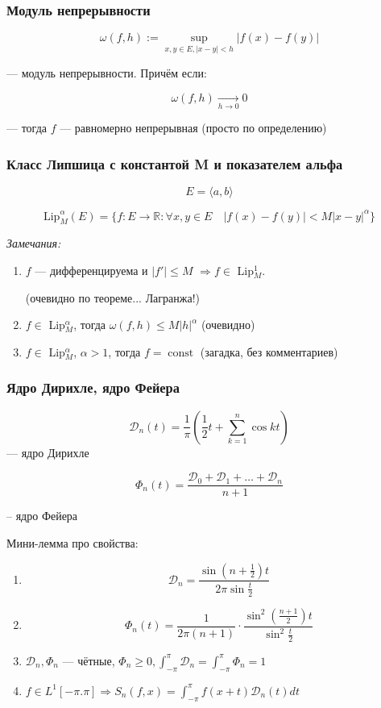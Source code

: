 \documentclass{article}
\def\dbl{\,\,}
\def\goesto#1{\underset{#1}{\longrightarrow}}
\def\DD{\mathcal{D}}
\DeclareMathOperator{\const}{const}
\begin{document}
\subsubsection{Модуль непрерывности}

\[\omega(f, h) := \sup_{x, y \in E,  |x - y| < h} |f(x) - f(y)|\]

--- модуль непрерывности. Причём если:

\[\omega(f, h) \goesto{h \rightarrow 0} 0\]

--- тогда $f$ --- равномерно непрерывная (просто по определению)

\subsubsection{Класс Липшица с константой M и показателем альфа}

\[E = \langle a, b \rangle\]

\[\text{Lip}_M^\alpha(E) = \{f: E \rightarrow \mathbb{R}: \forall x, y \in E \quad |f(x) - f(y)| < M|x - y|^\alpha\}\] 


\textit{Замечания:}

\begin{enumerate}
    \item $f$ --- дифференцируема и $|f'| \le M \dbl \Rightarrow f \in$ Lip$_M^1$.
    
    (очевидно по теореме... Лагранжа!)

    \item $f \in $ Lip$_M^\alpha$, тогда $\omega(f, h) \le M |h|^\alpha$ (очевидно)
    \item $f \in $ Lip$_M^\alpha$, $\alpha > 1$, тогда $f = \const$ (загадка, без комментариев)
\end{enumerate}

\subsubsection{Ядро Дирихле, ядро Фейера}

\[\DD_n(t) = \frac{1}{\pi}\left(\frac{1}{2}t + \sum_{k = 1}^{n} \cos kt\right)\]
--- ядро Дирихле

\[\Phi_n(t) = \frac{\DD_0 + \DD_1 + \ldots + \DD_n}{n + 1}\]

-- ядро Фейера

Мини-лемма про свойства:

\begin{enumerate}
    \item  \[\DD_n = \frac{\sin \left(n + \frac{1}{2}\right)t}{2\pi \sin \frac{t}{2}}\]
    \item  \[\Phi_n(t) = \frac{1}{2\pi(n + 1)}\cdot \frac{\sin^2\left(\frac{n + 1}{2}\right)t}{\sin^2 \frac{t}{2}}\]
    \item $\DD_n, \Phi_n$ --- чётные, $\Phi_n \ge 0, \int_{-\pi}^\pi \DD_n = \int_{-\pi}^\pi \Phi_n = 1$
    \item $f \in L^1[-\pi. \pi] \Rightarrow S_n(f, x) = \int_{-\pi}^{\pi} f(x + t) \DD_n(t) dt$
\end{enumerate}
\end{document}
